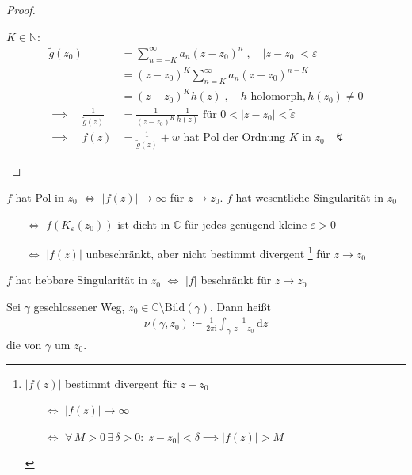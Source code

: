\begin{theorem}
\begin{proof}
\begin{enum-alph}
      \item $K \in \mathbb{N}$:
      \begin{align*}
        \widetilde{g}(z_0)
        &= \sum\limits_{n=-K}^{\infty} a_n (z-z_0)^n \; , \quad |z-z_0| < \varepsilon \\
        &= (z-z_0)^K \sum\limits_{n=K}^{\infty} a_n (z-z_0)^{n-K} \\
        &= (z-z_0)^K h(z) \; , \quad h \text{ holomorph}, h(z_0) \neq 0 \\
        \implies \quad \frac{1}{\widetilde{g}(z)} &= \frac{1}{(z-z_0)^K} \frac{1}{h(z)} \text{ für } 0 < |z-z_0| < \widetilde{\varepsilon} \\
        \implies \quad f(z) &= \frac{1}{\widetilde{g}(z)} + w \text{ hat Pol der Ordnung $K$ in $z_0$ $\lightning$}
      \end{align*}
    \end{enum-alph}
  \end{proof}
\end{theorem}

\begin{notice}[Folgerung:] \label{thm:4.8}
  $f$ hat Pol in $z_0$ $\iff$ $|f(z)| \to \infty$ für $z \to z_0$. $f$ hat wesentliche Singularität in $z_0$
  \begin{itemize}
    \item[$\iff$] $f(K_\varepsilon(z_0))$ ist dicht in $\mathbb{C}$ für jedes genügend kleine $\varepsilon > 0$
    
    \item[$\iff$] $|f(z)|$ unbeschränkt, aber nicht bestimmt divergent
    \footnote{
      $|f(z)|$ bestimmt divergent für $z-z_0$
      \begin{itemize}
        \item[$\iff$] $|f(z)| \to \infty$
        \item[$\iff$] $\forall \, M > 0 \, \exists \, \delta > 0 : |z-z_0| < \delta \implies |f(z)| > M$
      \end{itemize}
    }
    für $z \to z_0$
  \end{itemize}
  $f$ hat hebbare Singularität in $z_0$ $\iff$ $|f|$ beschränkt für $z \to z_0$
\end{notice}

\begin{theorem}[Definition]
  Sei $\gamma$ geschlossener Weg, $z_0 \in \mathbb{C} \setminus \mathrm{Bild}(\gamma)$. Dann heißt
  \begin{align*}
    \nu(\gamma,z_0) \coloneq \frac{1}{2 \pi \mathrm{i}} \int_\gamma \frac{1}{z-z_0} \, \mathrm{d}z
  \end{align*}
  die  von $\gamma$ um $z_0$.
\end{theorem}

